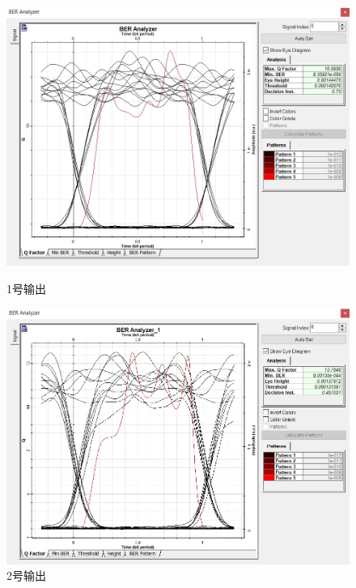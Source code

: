 \documentclass[12pt]{article}
\begin{document}
\begin{figure}[H]
    \begin{minipage}[t]{0.5\linewidth}
        \centering
        \includegraphics[scale=0.5]{Q-factor (1).jpg}
        \caption{1号输出}
        \label{fig:side:a}
      \end{minipage}%
      \begin{minipage}[t]{0.5\linewidth}
        \centering
        \includegraphics[scale=0.5]{Q-factor (2).jpg}
        \caption{2号输出}
        \label{fig:side:b}
      \end{minipage}
	  \begin{minipage}[t]{0.5\linewidth}
        \centering

\end{minipage}
\end{figure}
\end{document}
